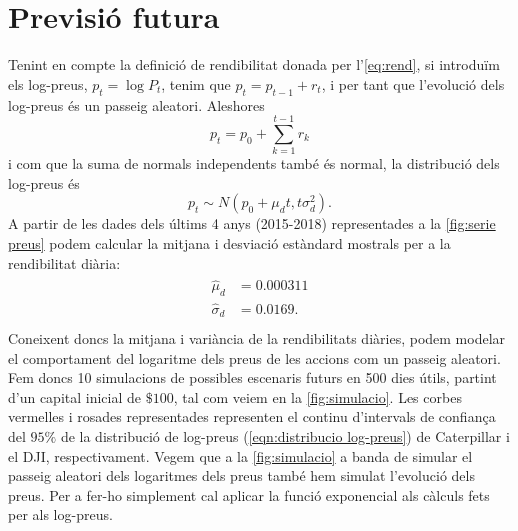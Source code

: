 \documentclass{article}
\numberwithin{table}{section}
\numberwithin{figure}{section}
\numberwithin{equation}{section}
\begin{document}
\section{Previsió futura}
Tenint en compte la definició de rendibilitat donada per l'\cref{eq:rend}, si introduïm els log-preus, \( p_t = \log{P_t} \), tenim que \( p_t = p_{t-1} + r_t \), i per tant que l'evolució dels log-preus és un passeig aleatori. Aleshores
\begin{equation} \label{eqn:passeig aleatori}
	p_t = p_0 + \sum_{k = 1}^{t-1}r_k 
\end{equation}
i com que la suma de normals independents també és normal, la distribució dels log-preus és
\begin{equation} \label{eqn:distribucio log-preus}
	p_t \sim N(p_0 + \mu_d t, t\sigma_d^2).
\end{equation}
A partir de les dades dels últims 4 anys (2015-2018) representades a la \cref{fig:serie preus} podem calcular la mitjana i desviació estàndard mostrals per a la rendibilitat diària:
\begin{align} \label{eq:parametres}
	\begin{split}
		\hat{\mu}_d &= 0.000311 \\
		\hat{\sigma}_d&	= 0.0169. \\
	\end{split}
\end{align}
Coneixent doncs la mitjana i variància de la rendibilitats diàries, podem modelar el comportament del logaritme dels preus de les accions com un passeig aleatori. Fem doncs 10 simulacions de
possibles escenaris futurs en 500 dies útils, partint d'un capital inicial de $\$100$, tal com veiem en la \cref{fig:simulacio}. Les corbes vermelles i rosades representades representen el continu d'intervals de confiança del $95\%$ de la distribució de log-preus (\cref{eqn:distribucio log-preus}) de Caterpillar i el DJI, respectivament. Vegem que a la \cref{fig:simulacio} a banda de simular el passeig aleatori dels logaritmes dels preus també hem simulat l'evolució dels preus. Per a fer-ho simplement cal aplicar la funció exponencial als càlculs fets per als log-preus.\\
\end{document}
